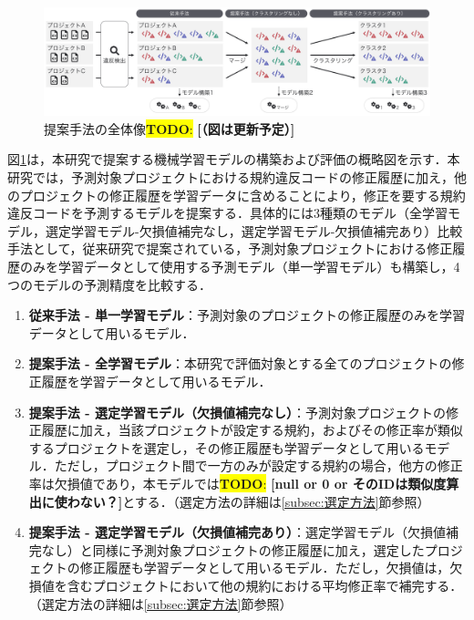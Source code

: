 \documentclass[submit]{ipsj}
\newcommand{\todo}[1]{\colorbox{yellow}{{\bf TODO}:}{\color{red} {\textbf{[#1]}}}}
\begin{document}
\begin{figure}[t]
    \centering
    \includegraphics[width=0.8\linewidth]{fig/kameoka_fig1.pdf}
    \caption{提案手法の全体像\todo{（図は更新予定）}}
    \label{fig:Teiannsyuhou}
\end{figure}

図\ref{fig:Teiannsyuhou}は，本研究で提案する機械学習モデルの構築および評価の概略図を示す．本研究では，予測対象プロジェクトにおける規約違反コードの修正履歴に加え，他のプロジェクトの修正履歴を学習データに含めることにより，修正を要する規約違反コードを予測するモデルを提案する．具体的には3種類のモデル（全学習モデル，選定学習モデル-欠損値補完なし，選定学習モデル-欠損値補完あり）比較手法として，従来研究で提案されている，予測対象プロジェクトにおける修正履歴のみを学習データとして使用する予測モデル（単一学習モデル）も構築し，4つのモデルの予測精度を比較する．

\begin{enumerate}
    \item \textbf{従来手法 - 単一学習モデル}：予測対象のプロジェクトの修正履歴のみを学習データとして用いるモデル\cite{JyuraiPre}．
    \item \textbf{提案手法 - 全学習モデル}：本研究で評価対象とする全てのプロジェクトの修正履歴を学習データとして用いるモデル．
    \item \textbf{提案手法 - 選定学習モデル（欠損値補完なし）}：予測対象プロジェクトの修正履歴に加え，当該プロジェクトが設定する規約，およびその修正率が類似するプロジェクトを選定し，その修正履歴も学習データとして用いるモデル．ただし，プロジェクト間で一方のみが設定する規約の場合，他方の修正率は欠損値であり，本モデルでは\todo{null or 0 or そのIDは類似度算出に使わない？}とする．（選定方法の詳細は\ref{subsec:選定方法}節参照）
    \item \textbf{提案手法 - 選定学習モデル（欠損値補完あり）}：選定学習モデル（欠損値補完なし）と同様に予測対象プロジェクトの修正履歴に加え，選定したプロジェクトの修正履歴も学習データとして用いるモデル．ただし，欠損値は，欠損値を含むプロジェクトにおいて他の規約における平均修正率で補完する．（選定方法の詳細は\ref{subsec:選定方法}節参照）
\end{enumerate}
\end{document}
